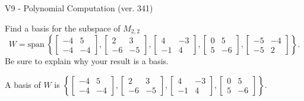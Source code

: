\begin{exercise}
  \begin{exerciseTitle}V9 - Polynomial Computation (ver. 341)\end{exerciseTitle}
  \begin{exerciseStatement}
    Find a basis for the subspace of \(M_{2,2}\) 
\[W=\mathrm{span}\ \left\{\left[\begin{array}{cc}
-4 & 5 \\
-4 & -4
\end{array}\right] , \left[\begin{array}{cc}
2 & 3 \\
-6 & -5
\end{array}\right] , \left[\begin{array}{cc}
4 & -3 \\
-1 & 4
\end{array}\right] , \left[\begin{array}{cc}
0 & 5 \\
5 & -6
\end{array}\right] , \left[\begin{array}{cc}
-5 & -4 \\
-5 & 2
\end{array}\right]\right\}.\]
 Be sure to explain why your result is a basis.


  \end{exerciseStatement}
  \begin{exerciseAnswer}
   A basis of \(W\) is  \(\left\{\left[\begin{array}{cc}
-4 & 5 \\
-4 & -4
\end{array}\right] , \left[\begin{array}{cc}
2 & 3 \\
-6 & -5
\end{array}\right] , \left[\begin{array}{cc}
4 & -3 \\
-1 & 4
\end{array}\right] , \left[\begin{array}{cc}
0 & 5 \\
5 & -6
\end{array}\right]\right\}\).
  


  \end{exerciseAnswer}
\end{exercise}